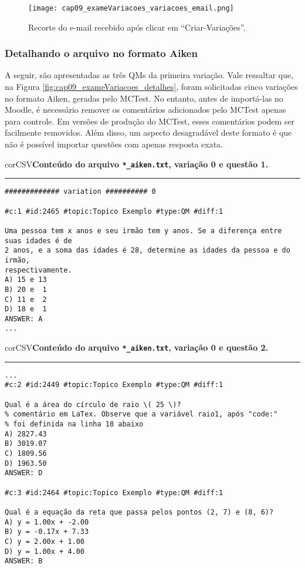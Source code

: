 \begin{figure}[!ht]
\centering
  \texttt{[image: cap09\_exameVariacoes\_variacoes\_email.png]}
  \caption{Recorte do e-mail recebido após clicar em ``Criar-Variações''.}
  \label{fig:cap09_xameVariacoes_variacoes_email}
\end{figure}

\subsubsection{Detalhando o arquivo no formato Aiken}

A seguir, são apresentadas as três QMs da primeira variação. Vale ressaltar que, na Figura \ref{fig:cap09_exameVariacoes_detalhes}, foram solicitadas cinco variações no formato Aiken, geradas pelo MCTest. No entanto, antes de importá-las no Moodle, é necessário remover os comentários adicionados pelo MCTest apenas para controle. Em versões de produção do MCTest, esses comentários podem ser facilmente removidos. Além disso, um aspecto desagradável deste formato é que não é possível importar questões com apenas resposta exata.

\begin{myboxCode}{corCSV}{\textbf{Conteúdo do arquivo \texttt{*\_aiken.txt}, variação 0 e questão 1.}}\vspace{3mm}
\hrule
\begin{verbatim}
############# variation ########## 0

#c:1 #id:2465 #topic:Topico Exemplo #type:QM #diff:1

Uma pessoa tem x anos e seu irmão tem y anos. Se a diferença entre suas idades é de 
2 anos, e a soma das idades é 28, determine as idades da pessoa e do irmão,
respectivamente. 
A) 15 e 13
B) 20 e  1
C) 11 e  2
D) 18 e  1
ANSWER: A
...
\end{verbatim}
\end{myboxCode}

\begin{myboxCode}{corCSV}{\textbf{Conteúdo do arquivo \texttt{*\_aiken.txt}, variação 0 e questão 2.}}\vspace{3mm}
\hrule
\begin{verbatim}
...
#c:2 #id:2449 #topic:Topico Exemplo #type:QM #diff:1

Qual é a área do círculo de raio \( 25 \)?
% comentário em LaTex. Observe que a variável raio1, após "code:" 
% foi definida na linha 18 abaixo
A) 2827.43
B) 3019.07
C) 1809.56
D) 1963.50
ANSWER: D

#c:3 #id:2464 #topic:Topico Exemplo #type:QM #diff:1

Qual é a equação da reta que passa pelos pontos (2, 7) e (8, 6)?
A) y = 1.00x + -2.00
B) y = -0.17x + 7.33
C) y = 2.00x + 1.00
D) y = 1.00x + 4.00
ANSWER: B
\end{verbatim}
\end{myboxCode}


